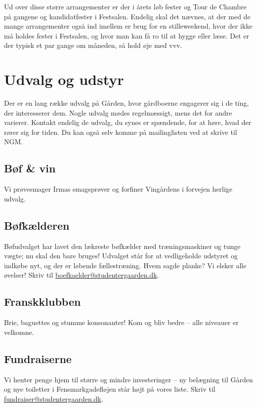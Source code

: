 \documentclass[11pt,article,twoside,openany,danish,extrafontsizes]{memoir} %
\begin{document}
\bigskip

Ud over disse større arrangementer er der i årets løb fester og Tour de Chambre på gangene og kandidatfester i Festsalen. Endelig skal det nævnes, at der med de mange arrangementer også ind imellem er brug for en stilleweekend, hvor der ikke må holdes fester i Festsalen, og hvor man kan få ro til at hygge eller læse. Det er der typisk et par gange om måneden, så hold øje med vvv.


\section{Udvalg og udstyr}
Der er en lang række udvalg på Gården, hvor gårdboerne engagerer sig i de ting, der interesserer dem. Nogle udvalg mødes regelmæssigt, mens det for andre varierer. Kontakt endelig de udvalg, du synes er spændende, for at høre, hvad der rører sig for tiden. Du kan også selv komme på mailinglisten ved at skrive til NGM.

\subsection{Bøf \& vin} Vi prøvesmager Irmas smagsprøver og forfiner Vingårdens i forvejen herlige udvalg. %





\subsection{Bøfkælderen}
Bøfudvalget har lavet den lækreste bøfkælder med træningsmaskiner og tunge vægte; nu skal den bare bruges! Udvalget står for at vedligeholde udstyret og indkøbe nyt, og der er løbende fællestræning. Hvem sagde planke? Vi elsker alle øvelser! Skriv til \url{boefkaelder@studentergaarden.dk}.

\subsection{Franskklubben}
Brie, baguettes og stumme konsonanter! Kom og bliv bedre -- alle niveauer er velkomne.

\subsection{Fundraiserne}
Vi henter penge hjem til større og mindre investeringer -- ny belægning til Gården og nye toiletter i Fensmarkgadefløjen står højt på vores liste. Skriv til \url{fundraiser@studentergaarden.dk}.
\end{document}
